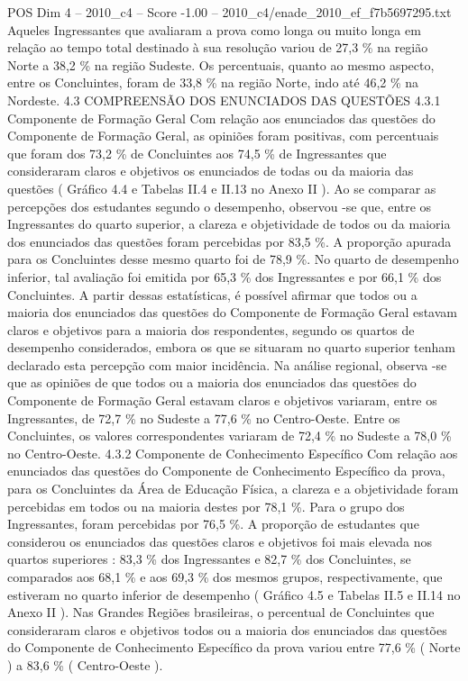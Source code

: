 \begin{textsample}{POS Dim 4 – 2010\_c4 – Score -1.00 – 2010\_c4/enade\_2010\_ef\_f7b5697295.txt}
Aqueles Ingressantes que avaliaram a prova como longa ou muito longa em relação ao tempo total destinado à sua resolução variou de 27,3 \% na região Norte a 38,2 \% na região Sudeste.
Os percentuais, quanto ao mesmo aspecto, entre os Concluintes, foram de 33,8 \% na região Norte, indo até 46,2 \% na Nordeste. 4.3 COMPREENSÃO DOS ENUNCIADOS DAS QUESTÕES 4.3.1 Componente de Formação Geral Com relação aos enunciados das questões do Componente de Formação Geral, as opiniões foram positivas, com percentuais que foram dos 73,2 \% de Concluintes aos 74,5 \% de Ingressantes que consideraram claros e objetivos os enunciados de todas ou da maioria das questões ( Gráfico 4.4 e Tabelas II.4 e II.13 no Anexo II ).
Ao se comparar as percepções dos estudantes segundo o desempenho, observou -se que, entre os Ingressantes do quarto superior, a clareza e objetividade de todos ou da maioria dos enunciados das questões foram percebidas por 83,5 \%.
A proporção apurada para os Concluintes desse mesmo quarto foi de 78,9 \%.
No quarto de desempenho inferior, tal avaliação foi emitida por 65,3 \% dos Ingressantes e por 66,1 \% dos Concluintes.
A partir dessas estatísticas, é possível afirmar que todos ou a maioria dos enunciados das questões do Componente de Formação Geral estavam claros e objetivos para a maioria dos respondentes, segundo os quartos de desempenho considerados, embora os que se situaram no quarto superior tenham declarado esta percepção com maior incidência.
Na análise regional, observa -se que as opiniões de que todos ou a maioria dos enunciados das questões do Componente de Formação Geral estavam claros e objetivos variaram, entre os Ingressantes, de 72,7 \% no Sudeste a 77,6 \% no Centro-Oeste.
Entre os Concluintes, os valores correspondentes variaram de 72,4 \% no Sudeste a 78,0 \% no Centro-Oeste. 4.3.2 Componente de Conhecimento Específico Com relação aos enunciados das questões do Componente de Conhecimento Específico da prova, para os Concluintes da Área de Educação Física, a clareza e a objetividade foram percebidas em todos ou na maioria destes por 78,1 \%.
Para o grupo dos Ingressantes, foram percebidas por 76,5 \%.
A proporção de estudantes que considerou os enunciados das questões claros e objetivos foi mais elevada nos quartos superiores : 83,3 \% dos Ingressantes e 82,7 \% dos Concluintes, se comparados aos 68,1 \% e aos 69,3 \% dos mesmos grupos, respectivamente, que estiveram no quarto inferior de desempenho ( Gráfico 4.5 e Tabelas II.5 e II.14 no Anexo II ).
Nas Grandes Regiões brasileiras, o percentual de Concluintes que consideraram claros e objetivos todos ou a maioria dos enunciados das questões do Componente de Conhecimento Específico da prova variou entre 77,6 \% ( Norte ) a 83,6 \% ( Centro-Oeste ).

\end{textsample}
